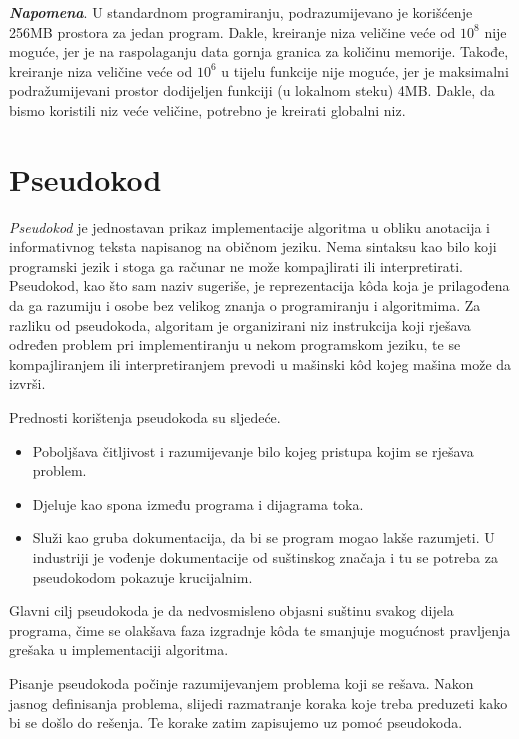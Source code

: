  
  \textbf{\textit{Napomena}}. U standardnom programiranju, podrazumijevano je kori\-šćenje 256MB prostora za jedan program. Dakle, kreiranje   niza veličine veće od $10^8$ nije moguće, jer je na raspolaganju data gornja granica za količinu memorije. Takođe, kreiranje  niza veličine veće od $10^6$ u tijelu funkcije nije moguće, jer je maksimalni podražumijevani prostor dodijeljen funkciji (u lokalnom steku) 4MB. Dakle, da bismo koristili niz veće veličine, potrebno je kreirati globalni niz.  

\section{Pseudokod}

\textit{Pseudokod} je jednostavan prikaz implementacije algoritma u obliku anotacija i informativnog teksta napisanog na običnom jeziku. Nema sintaksu kao bilo koji programski jezik i stoga ga računar ne može kompajlirati ili interpre\-tirati. %
 Pseudokod, kao što sam naziv sugeriše, je reprezentacija k\^oda koja je prilagođena da ga razumiju i osobe bez velikog znanja o programiranju i algoritmima. Za razliku od pseudokoda, algoritam je organizirani   niz instrukcija koji rješava određen problem pri implementiranju u nekom pro\-gramskom jeziku, te se kompajliranjem  ili interpretiranjem prevodi u mašinski k\^od kojeg mašina može da izvrši.

Prednosti korištenja pseudokoda su sljedeće. 
\begin{itemize}
	\item Poboljšava čitljivost i razumijevanje bilo kojeg pristupa kojim se rješava problem.
	\item Djeluje kao spona između programa i dijagrama toka.
	\item Služi kao gruba dokumentacija, da bi se program mogao lakše razumjeti. U industriji je vođenje dokumentacije od suštinskog značaja i tu se potreba za pseudokodom pokazuje krucijalnim.
\end{itemize}
 
 
Glavni cilj pseudokoda je da nedvosmisleno objasni suštinu svakog dijela programa, čime se olakšava faza izgradnje k\^oda te smanjuje mogućnost pravljenja  grešaka u implementaciji algoritma.

Pisanje pseudokoda počinje razumijevanjem problema koji se rešava. Nakon  jasnog definisanja problema, slijedi razmatranje koraka koje treba preduzeti kako bi se došlo do rešenja. Te korake zatim zapisujemo uz pomoć  pseudokoda.

